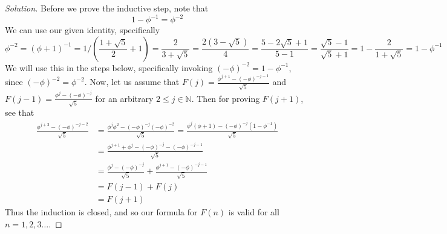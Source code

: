 \documentclass{article}
\newcommand{\N}{{\mathbb N}}
\begin{document}
\begin{proof}[Solution]
Before we prove the inductive step, note that
\[
	1 - \phi^{-1} = \phi^{-2}
\]
We can use our given identity,
specifically
\[
	\phi^{-2} = (\phi + 1)^{-1} = 1/\left(\frac{1+\sqrt{5}}{2}+1\right)
	= \frac{2}{3+\sqrt{5}} = \frac{2(3 - \sqrt{5})}{4}
	= \frac{5 - 2\sqrt{5} + 1}{5 - 1} = \frac{\sqrt{5} - 1}{\sqrt{5} + 1}
	= 1 - \frac{2}{1 + \sqrt{5}} = 1 - \phi^{-1}
\]
We will use this in the steps below,
specifically invoking $(-\phi)^{-2} = 1 - \phi^{-1}$, since $(-\phi)^{-2} = \phi^{-2}$.
Now, let us assume that $F(j) = \frac{\phi^{j+1} - (-\phi)^{-j-1}}{\sqrt{5}}$
and $F(j-1) = \frac{\phi^{j} - (-\phi)^{-j}}{\sqrt{5}}$
for an arbitrary $2 \leq j \in \N$. Then for proving $F(j+1)$, see that
\begin{align*}
	\frac{\phi^{j+2} - (-\phi)^{-j-2}}{\sqrt{5}}
	&= \frac{\phi^{j}\phi^2 - (-\phi)^{-j}(-\phi)^{-2}}{\sqrt{5}}
	= \frac{\phi^{j}(\phi+1) - (-\phi)^{-j}(1 - \phi^{-1})}{\sqrt{5}}\\
	&= \frac{\phi^{j+1} + \phi^j - (-\phi)^{-j} - (-\phi)^{-j-1}}{\sqrt{5}}\\
	&=  \frac{\phi^j - (-\phi)^{-j}}{\sqrt{5}} +
	\frac{\phi^{j+1} - (-\phi)^{-j-1}}{\sqrt{5}}\\
	&= F(j-1) + F(j)\\ &= F(j+1)
\end{align*}
Thus the induction is closed, and so our formula for $F(n)$ is valid
for all $n = 1,2,3\dots$.
\end{proof}
\clearpage
\end{document}
